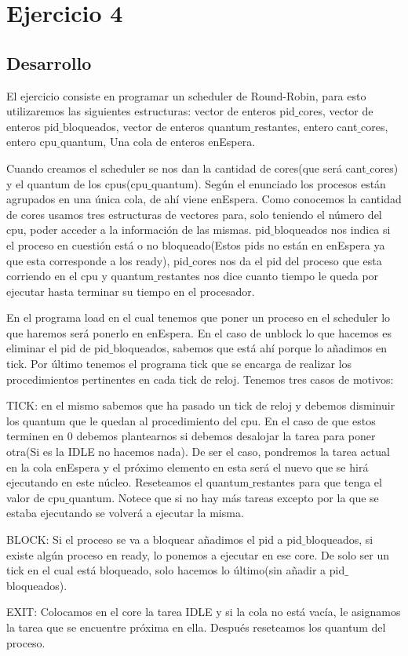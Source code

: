 \section{Ejercicio 4}

\subsection{Desarrollo}
El ejercicio consiste en programar un scheduler de Round-Robin, para esto utilizaremos las siguientes estructuras: vector de enteros pid$\_$cores, vector de enteros pid$\_$bloqueados, 
vector de enteros quantum$\_$restantes, entero cant$\_$cores, entero cpu$\_$quantum, Una cola de enteros enEspera.

Cuando creamos el scheduler se nos dan la cantidad de cores(que será cant$\_$cores) y el quantum de los cpus(cpu$\_$quantum). Según el enunciado los procesos están agrupados 
en una única cola, de ahí viene enEspera. Como conocemos la cantidad de cores usamos tres estructuras de vectores para, solo teniendo el número del cpu, poder acceder a la 
información de las mismas. pid$\_$bloqueados nos indica si el proceso en cuestión está o no bloqueado(Estos pids no están en enEspera ya que esta corresponde a los
ready), pid$\_$cores nos da el pid del proceso que esta corriendo en el cpu y quantum$\_$restantes nos dice cuanto tiempo le queda por ejecutar hasta terminar su tiempo en el 
procesador.

En el programa load en el cual tenemos que poner un proceso en el scheduler lo que haremos será ponerlo en enEspera. En el caso de unblock lo que hacemos es eliminar el pid de 
pid$\_$bloqueados, sabemos que está ahí porque lo añadimos en tick. Por último tenemos el programa tick que se encarga de realizar los procedimientos pertinentes en cada tick de reloj. Tenemos tres casos de motivos:
 
TICK: en el mismo sabemos que ha pasado un tick de reloj y debemos disminuir los quantum que le quedan al procedimiento del cpu. En el caso de que estos terminen en 0 debemos 
plantearnos si debemos desalojar la tarea para poner otra(Si es la IDLE no hacemos nada). De ser el caso, pondremos la tarea actual en la cola enEspera y el próximo elemento
en esta será el nuevo que se hirá ejecutando en este núcleo. Reseteamos el quantum$\_$restantes para que tenga el valor de cpu$\_$quantum. Notece que si no hay más tareas
excepto por la que se estaba ejecutando se volverá a ejecutar la misma.

BLOCK: Si el proceso se va a bloquear añadimos el pid a pid$\_$bloqueados, si existe algún proceso en ready, lo ponemos a ejecutar en ese core. De solo ser un tick en el cual
está bloqueado, solo hacemos lo último(sin añadir a pid$\_$bloqueados).

EXIT: Colocamos en el core la tarea IDLE y si la cola no está vacía, le asignamos la tarea que se encuentre próxima en ella. Después reseteamos los quantum del proceso. 

